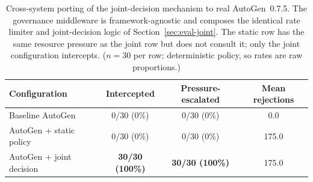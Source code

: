 \begin{table}[t]
\centering
\caption{Cross-system porting of the joint-decision mechanism to real
AutoGen~0.7.5. The governance middleware is framework-agnostic and
composes the identical rate limiter and joint-decision logic of
Section~\ref{sec:eval-joint}. The static row has the same resource
pressure as the joint row but does not consult it; only the joint
configuration intercepts. ($n=30$ per row; deterministic policy, so
rates are raw proportions.)}
\label{tab:autogen-joint-porting}
\begin{tabular}{lccc}
\toprule
Configuration & Intercepted & Pressure-escalated & Mean rejections \\
\midrule
Baseline AutoGen              & 0/30 (0\%)   & 0/30 (0\%)   & 0.0 \\
AutoGen + static policy       & 0/30 (0\%)   & 0/30 (0\%)   & 175.0 \\
AutoGen + joint decision      & \textbf{30/30 (100\%)} & \textbf{30/30 (100\%)} & 175.0 \\
\bottomrule
\end{tabular}
\end{table}

